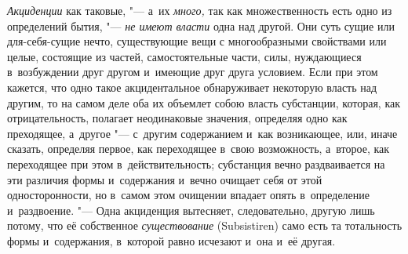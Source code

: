 {\em Акциденции} как таковые, "--- а~их
{\em много,} так как множественность есть одно из
определений бытия, "--- {\em не имеют власти} одна над
другой. Они суть сущие или для-себя-сущие нечто, существующие вещи с
многообразными свойствами или целые, состоящие из частей, самостоятельные
части, силы, нуждающиеся в~возбуждении друг другом и~имеющие друг друга
условием. Если при этом кажется, что одно такое акцидентальное обнаруживает
некоторую власть над другим, то на самом деле оба их объемлет собою власть
субстанции, которая, как отрицательность, полагает неодинаковые значения,
определяя одно как преходящее, а~другое "--- с~другим содержанием и~как
возникающее, или, иначе сказать, определяя первое, как переходящее в~свою
возможность, а~второе, как переходящее при этом в~действительность;
субстанция вечно раздваивается на эти различия формы и~содержания и~вечно
очищает себя от этой односторонности, но в~самом этом очищении впадает
опять в~определение и~раздвоение. "--- Одна акциденция вытесняет,
следовательно, другую лишь потому, что её собственное
{\em существование} (Subsistiren) само есть та
тотальность формы и~содержания, в~которой равно исчезают и~она и~её другая.

